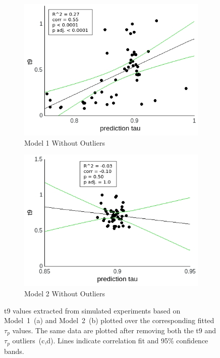 \documentclass[a4paper]{scrreprt}
\begin{document}
\begin{figure}
\begin{subfigure}[b]{0.49\textwidth}
        \includegraphics[width=\textwidth]{figs/sec3/pred/predno_t9no_mod1.jpeg}
        \caption{Model 1 Without Outliers}
    \end{subfigure}
    \begin{subfigure}[b]{0.49\textwidth}
        \includegraphics[width=\textwidth]{figs/sec3/pred/predno_t9no_mod2.jpeg}
        \caption{Model 2 Without Outliers}
    \end{subfigure}
\caption{t9 values extracted from simulated experiments based on Model~1~(a) and Model~2~(b) plotted over the corresponding fitted $\tau_p$ values. The same data are plotted after removing both the t9 and $\tau_p$ outliers~(c,d). Lines indicate correlation fit and 95\% confidence bands.}
\label{fig:pred_t9}
\end{figure}
\end{document}
